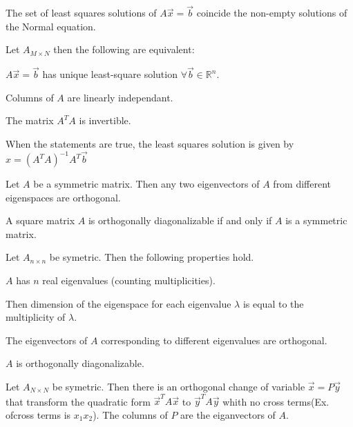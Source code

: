 \documentclass[5pt]{article}
\begin{document}
\begin{multicols}{2}
\begin{theorem}
  The set of least squares solutions of $A\vec{x}=\vec{b}$ coincide the non-empty solutions of the Normal equation.
\end{theorem}

\begin{theorem}
  Let $A_{M\times N}$ then the following are equivalent: 
  \begin{itemize*}
    \item $A\vec{x}=\vec{b}$ has unique least-square solution $\forall\vec{b}\in\mathbb{R}^n$.
    \item Columns of $A$ are linearly independant.
    \item The matrix $A^TA$ is invertible.
  \end{itemize*}
  When the statements are true, the least squares solution is given by $\hat{x}=(A^TA)^{-1}A^T\vec{b}$
\end{theorem}

\begin{theorem}
  Let $A$ be a symmetric matrix. Then any two eigenvectors of $A$ from different eigenspaces are
orthogonal.
\end{theorem}

\begin{theorem}
  A square matrix $A$ is orthogonally diagonalizable if and only if $A$ is a symmetric matrix.
\end{theorem}

\begin{theorem}
  Let $A_{n\times n}$ be symetric. Then the following properties hold.
  \begin{itemize*}
    \item $A$ has $n$ real eigenvalues (counting multiplicities).
    \item Then dimension of the eigenspace for each eigenvalue $\lambda$ is equal to the multiplicity of $\lambda$.
    \item The eigenvectors of $A$ corresponding to different eigenvalues are orthogonal.
    \item $A$ is orthogonally diagonalizable.
  \end{itemize*}
\end{theorem}

\begin{theorem}
  Let $A_{N\times N}$ be symetric. Then there is an orthogonal change of variable $\vec{x}=P\vec{y}$ that transform the quadratic form $\vec{x}^TA\vec{x}$ to $\vec{y}^TA\vec{y}$ whith no cross terms(Ex. ofcross terms is $x_1x_2$). 
  The columns of $P$ are the eiganvectors of $A$.
\end{theorem}


\end{multicols}
\end{document}
